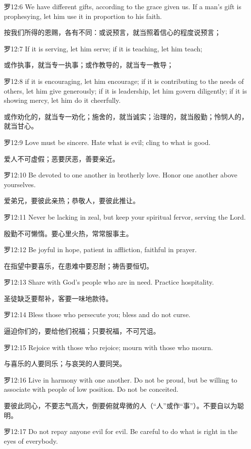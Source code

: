 \documentclass[a4paper,11pt,onecolumn,twoside]{ctexart}
\begin{document}
\begin{multicols}{2}
 罗12:6
 We have different gifts, according to the grace given us. If a man's gift is prophesying, let him use it in proportion to his faith.

 按我们所得的恩赐，各有不同：或说预言，就当照着信心的程度说预言；


 罗12:7
 If it is serving, let him serve; if it is teaching, let him teach;

 或作执事，就当专一执事；或作教导的，就当专一教导；


 罗12:8
 if it is encouraging, let him encourage; if it is contributing to the needs of others, let him give generously; if it is leadership, let him govern diligently; if it is showing mercy, let him do it cheerfully.

 或作劝化的，就当专一劝化；施舍的，就当诚实；治理的，就当殷勤；怜悯人的，就当甘心。


 罗12:9
 Love must be sincere. Hate what is evil; cling to what is good.

 爱人不可虚假；恶要厌恶，善要亲近。


 罗12:10
 Be devoted to one another in brotherly love. Honor one another above yourselves.

 爱弟兄，要彼此亲热；恭敬人，要彼此推让。


 罗12:11
 Never be lacking in zeal, but keep your spiritual fervor, serving the Lord.

 殷勤不可懒惰。要心里火热，常常服事主。


 罗12:12
 Be joyful in hope, patient in affliction, faithful in prayer.

 在指望中要喜乐，在患难中要忍耐；祷告要恒切。


 罗12:13
 Share with God's people who are in need. Practice hospitality.

 圣徒缺乏要帮补，客要一味地款待。


 罗12:14
 Bless those who persecute you; bless and do not curse.

 逼迫你们的，要给他们祝福；只要祝福，不可咒诅。


 罗12:15
 Rejoice with those who rejoice; mourn with those who mourn.

 与喜乐的人要同乐；与哀哭的人要同哭。


 罗12:16
 Live in harmony with one another. Do not be proud, but be willing to associate with people of low position. Do not be conceited.

 要彼此同心，不要志气高大，倒要俯就卑微的人（“人”或作“事”）。不要自以为聪明。


 罗12:17
 Do not repay anyone evil for evil. Be careful to do what is right in the eyes of everybody.


\end{multicols}
\end{document}
